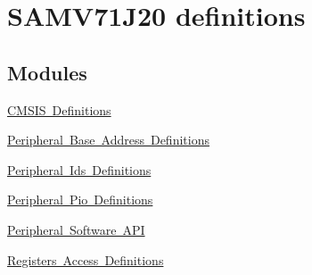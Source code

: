 \hypertarget{group__SAMV71J20__definitions}{}\section{S\+A\+M\+V71\+J20 definitions}
\label{group__SAMV71J20__definitions}
\subsection*{Modules}
\begin{DoxyCompactItemize}
\item 
\mbox{\hyperlink{group__SAMV71J20__cmsis}{C\+M\+S\+I\+S Definitions}}
\item 
\mbox{\hyperlink{group__SAMV71J20__base}{Peripheral Base Address Definitions}}
\item 
\mbox{\hyperlink{group__SAMV71J20__id}{Peripheral Ids Definitions}}
\item 
\mbox{\hyperlink{group__SAMV71J20__pio}{Peripheral Pio Definitions}}
\item 
\mbox{\hyperlink{group__SAMV71J20__api}{Peripheral Software A\+PI}}
\item 
\mbox{\hyperlink{group__SAMV71J20__reg}{Registers Access Definitions}}
\end{DoxyCompactItemize}
